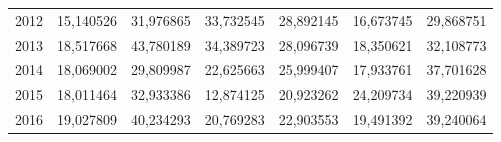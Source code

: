 \begin{table}
\begin{tabular}{p{1cm}p{2cm}p{2cm}p{2cm}p{2cm}p{2cm}p{2cm}}
 2012 &                              15,140526 & 31,976865 &      33,732545 &         28,892145 & 16,673745 &                           29,868751 \\
 2013 &                              18,517668 & 43,780189 &      34,389723 &         28,096739 & 18,350621 &                           32,108773 \\
 2014 &                              18,069002 & 29,809987 &      22,625663 &         25,999407 & 17,933761 &                           37,701628 \\
 2015 &                              18,011464 & 32,933386 &      12,874125 &         20,923262 & 24,209734 &                           39,220939 \\
 2016 &                              19,027809 & 40,234293 &      20,769283 &         22,903553 & 19,491392 &                           39,240064 \\
\bottomrule
\end{tabular}
\end{table}
